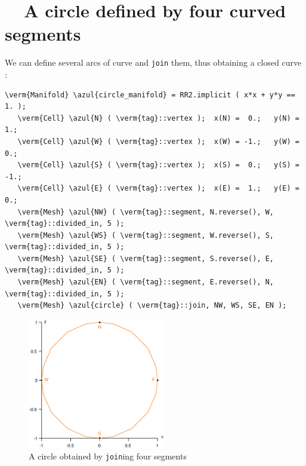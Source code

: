 \section{~~A circle defined by four curved segments}\label{\numb section 2.\numb parag 4}

We can define several arcs of curve and {\small\tt join} them, thus obtaining a closed curve :
\medskip

\begin{Verbatim}[commandchars=\\\{\},formatcom=\small\tt,frame=single,
   label=main-\ref{\numb section 2.\numb parag 4}.cpp,rulecolor=\color{coment},
   baselinestretch=0.94,framesep=2mm]
   \verm{Manifold} \azul{circle_manifold} = RR2.implicit ( x*x + y*y == 1. );
   \verm{Cell} \azul{N} ( \verm{tag}::vertex );  x(N) =  0.;   y(N) =  1.;
   \verm{Cell} \azul{W} ( \verm{tag}::vertex );  x(W) = -1.;   y(W) =  0.;
   \verm{Cell} \azul{S} ( \verm{tag}::vertex );  x(S) =  0.;   y(S) = -1.;
   \verm{Cell} \azul{E} ( \verm{tag}::vertex );  x(E) =  1.;   y(E) =  0.;
   \verm{Mesh} \azul{NW} ( \verm{tag}::segment, N.reverse(), W, \verm{tag}::divided_in, 5 );
   \verm{Mesh} \azul{WS} ( \verm{tag}::segment, W.reverse(), S, \verm{tag}::divided_in, 5 );
   \verm{Mesh} \azul{SE} ( \verm{tag}::segment, S.reverse(), E, \verm{tag}::divided_in, 5 );
   \verm{Mesh} \azul{EN} ( \verm{tag}::segment, E.reverse(), N, \verm{tag}::divided_in, 5 );
   \verm{Mesh} \azul{circle} ( \verm{tag}::join, NW, WS, SE, EN );
\end{Verbatim}

\begin{figure} \centering
  \includegraphics[width=60mm]{circle}
  \caption{A circle obtained by {\small\tt join}ing four segments}
  \label{\numb section 2.\numb fig 4}
\end{figure}


